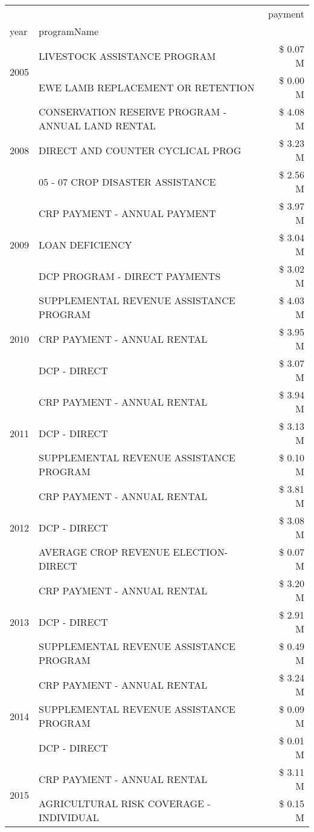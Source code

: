 \begin{tabular}{llr}
\toprule
 &  & payment \\
year & programName &  \\
\midrule
\multirow[t]{2}{*}{2005} & LIVESTOCK ASSISTANCE PROGRAM & \$ 0.07 M \\
 & EWE LAMB REPLACEMENT OR RETENTION & \$ 0.00 M \\
\cline{1-3}
\multirow[t]{3}{*}{2008} & CONSERVATION RESERVE PROGRAM - ANNUAL LAND RENTAL & \$ 4.08 M \\
 & DIRECT AND COUNTER CYCLICAL PROG & \$ 3.23 M \\
 & 05 - 07 CROP DISASTER ASSISTANCE & \$ 2.56 M \\
\cline{1-3}
\multirow[t]{3}{*}{2009} & CRP PAYMENT - ANNUAL PAYMENT & \$ 3.97 M \\
 & LOAN DEFICIENCY & \$ 3.04 M \\
 & DCP PROGRAM - DIRECT PAYMENTS & \$ 3.02 M \\
\cline{1-3}
\multirow[t]{3}{*}{2010} & SUPPLEMENTAL REVENUE ASSISTANCE PROGRAM & \$ 4.03 M \\
 & CRP PAYMENT - ANNUAL RENTAL & \$ 3.95 M \\
 & DCP - DIRECT & \$ 3.07 M \\
\cline{1-3}
\multirow[t]{3}{*}{2011} & CRP PAYMENT - ANNUAL RENTAL & \$ 3.94 M \\
 & DCP - DIRECT & \$ 3.13 M \\
 & SUPPLEMENTAL REVENUE ASSISTANCE PROGRAM & \$ 0.10 M \\
\cline{1-3}
\multirow[t]{3}{*}{2012} & CRP PAYMENT - ANNUAL RENTAL & \$ 3.81 M \\
 & DCP - DIRECT & \$ 3.08 M \\
 & AVERAGE CROP REVENUE ELECTION-DIRECT & \$ 0.07 M \\
\cline{1-3}
\multirow[t]{3}{*}{2013} & CRP PAYMENT - ANNUAL RENTAL & \$ 3.20 M \\
 & DCP - DIRECT & \$ 2.91 M \\
 & SUPPLEMENTAL REVENUE ASSISTANCE PROGRAM & \$ 0.49 M \\
\cline{1-3}
\multirow[t]{3}{*}{2014} & CRP PAYMENT - ANNUAL RENTAL & \$ 3.24 M \\
 & SUPPLEMENTAL REVENUE ASSISTANCE PROGRAM & \$ 0.09 M \\
 & DCP - DIRECT & \$ 0.01 M \\
\cline{1-3}
\multirow[t]{3}{*}{2015} & CRP PAYMENT - ANNUAL RENTAL & \$ 3.11 M \\
 & AGRICULTURAL RISK COVERAGE - INDIVIDUAL & \$ 0.15 M \\

\end{tabular}
